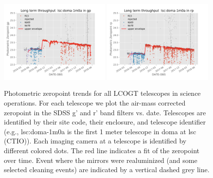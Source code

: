 \documentclass[]{spie}
\begin{document}
\begin{figure}
\includegraphics[width=0.49\textwidth]{images/photzptrend-lsc-doma-1m0a-gp.png}  \hspace*{\fill}
\includegraphics[width=0.49\textwidth]{images/photzptrend-lsc-doma-1m0a-rp.png} \\[1ex]

\caption{\label{fig_zpLSC} Photometric zeropoint trends for all LCOGT telescopes in science
operations. For each telescope we plot the air-mass corrected zeropoint in the SDSS g' and r' band
filters vs. date. Telescopes are identified by their site code, their enclosure, and telescope
identifier (e.g., lsc:doma-1m0a is the first 1 meter telescope in doma at lsc (CTIO)). Each imaging
camera at a telescope is identified by different colored dots. The red line indicates a fit of the
zeropoint over time. Event where the mirrors were realuminized (and some selected cleaning events)
are indicated by a vertical dashed grey line.}

\end{figure}
\end{document}
